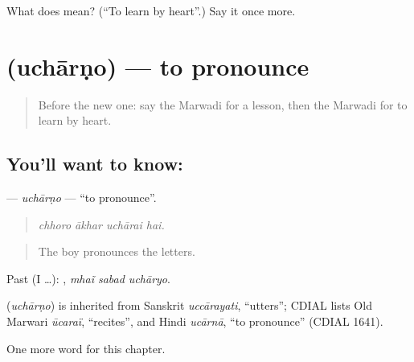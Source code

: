 \begin{tcolorbox}[breakable,colback=teal!4,colframe=teal!35!black,title={Before you move on}]
What does  mean? (\textquotedblleft{}To learn by heart\textquotedblright{}.) Say it once more.
\end{tcolorbox}
\section[\texorpdfstring{\mw{उचारणो} (uchārṇo)}{उचारणो (uchārṇo)}]{ (uchārṇo) — to pronounce}

\label{lesson:MW-C285-ucharno}



\begin{quote}
Before the new one: say the Marwadi for a lesson, then the Marwadi for to learn by heart.
\end{quote}

\subsection*{You'll want to know: }
\textbf{} — \emph{uchārṇo} — \textquotedblleft{}to pronounce\textquotedblright{}.

\begin{quote}
   
\end{quote}

\begin{quote}
\emph{chhoro ākhar uchārai hai.}
\end{quote}

\begin{quote}
The boy pronounces the letters.
\end{quote}

Past (I …):   , \emph{mhaĩ sabad uchāryo}.

\begin{cousinweb}
\textbf{} (\emph{uchārṇo}) is inherited from Sanskrit \emph{uccārayati}, \textquotedblleft{}utters\textquotedblright{}; CDIAL lists Old Marwari \emph{ūcaraï}, \textquotedblleft{}recites\textquotedblright{}, and Hindi \emph{ucārnā}, \textquotedblleft{}to pronounce\textquotedblright{} (CDIAL 1641).
\end{cousinweb}

\begin{grammarlens}[title={What you've built}]
One more word for this chapter.
\end{grammarlens}

